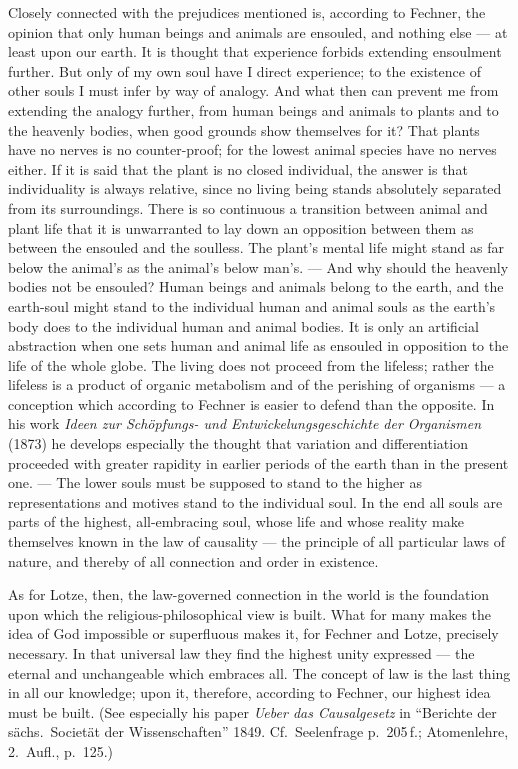 \documentclass[12pt,a4paper]{book}
\newcommand{\opage}[1]{\marginnote{\footnotesize\textit{[#1]}}}
\begin{document}
\opage{529}Closely connected with the prejudices mentioned is, according to Fechner, the
opinion that only human beings and animals are ensouled, and nothing else --- at
least upon our earth. It is thought that experience forbids extending ensoulment
further. But only of my own soul have I direct experience; to the existence of
other souls I must infer by way of analogy. And what then can prevent me from
extending the analogy further, from human beings and animals to plants and to the
heavenly bodies, when good grounds show themselves for it? That plants have no
nerves is no counter-proof; for the lowest animal species have no nerves either.
If it is said that the plant is no closed individual, the answer is that
individuality is always relative, since no living being stands absolutely
separated from its surroundings. There is so continuous a transition between
animal and plant life that it is unwarranted to lay down an opposition between
them as between the ensouled and the soulless. The plant's mental life might
stand as far below the animal's as the animal's below man's. --- And why should
the heavenly bodies not be ensouled? Human beings and animals belong to the
earth, and the earth-soul might stand to the individual human and animal souls as
the earth's body does to the individual human and animal bodies. It is only an
artificial abstraction when one sets human and animal life as ensouled in
opposition to the life of the whole globe. The living does not proceed from the
lifeless; rather the lifeless is a product of organic metabolism and of the
perishing of organisms --- a conception which according to Fechner is easier to
defend than the opposite. In his work \textit{Ideen zur Schöpfungs- und
Entwickelungsgeschichte der Organismen} (1873) he develops especially the thought
that variation and differentiation proceeded with greater rapidity in earlier
periods of the earth than in the present one. --- The lower souls must be
supposed to stand to the higher as representations and motives stand to the
individual soul. In the end all souls are parts of the highest, all-embracing
soul, whose life and whose reality make themselves known in the law of causality
--- the principle of all particular laws of nature, and thereby of all connection
and order in existence.

As for Lotze, then, the law-governed connection \opage{530}in the world is the foundation
upon which the religious-philosophical view is built. What for many makes the
idea of God impossible or superfluous makes it, for Fechner and Lotze, precisely
necessary. In that universal law they find the highest unity expressed --- the
eternal and unchangeable which embraces all. The concept of law is the last thing
in all our knowledge; upon it, therefore, according to Fechner, our highest idea
must be built. (See especially his paper \textit{Ueber das Causalgesetz} in
``Berichte der sächs.\ Societät der Wissenschaften'' 1849. Cf.\ Seelenfrage
p.~205\,f.; Atomenlehre, 2.~Aufl., p.~125.)
\end{document}
